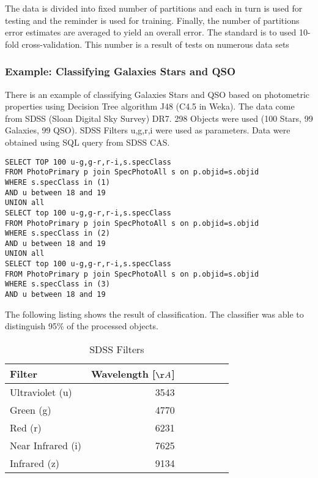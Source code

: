 The data is divided into fixed number of partitions and each in turn
is used for testing and the reminder is used for training. Finally,
the number of partitions error estimates are averaged to yield an
overall error. The standard is to used 10-fold cross-validation. This
number is a result of tests on numerous data sets \citep{witten2005data}

\subsubsection{Example: Classifying Galaxies Stars and QSO}
There is an example of classifying Galaxies Stars and QSO based on
photometric properties using Decision Tree algorithm J48 (C4.5 in
Weka). The data come from SDSS (Sloan Digital Sky Survey) DR7. 298
Objects were used (100 Stars, 99 Galaxies, 99 QSO). SDSS Filters
u,g,r,i were used as parameters. Data were obtained using SQL query
from SDSS CAS.

\begin{lstlisting}
SELECT TOP 100 u-g,g-r,r-i,s.specClass
FROM PhotoPrimary p join SpecPhotoAll s on p.objid=s.objid 
WHERE s.specClass in (1)
AND u between 18 and 19
UNION all
SELECT top 100 u-g,g-r,r-i,s.specClass
FROM PhotoPrimary p join SpecPhotoAll s on p.objid=s.objid 
WHERE s.specClass in (2)
AND u between 18 and 19
UNION all
SELECT top 100 u-g,g-r,r-i,s.specClass
FROM PhotoPrimary p join SpecPhotoAll s on p.objid=s.objid 
WHERE s.specClass in (3)
AND u between 18 and 19
\end{lstlisting}

The following listing shows the result of classification. The
classifier was able to distinguish 95\% of the processed objects.

\begin{table}[ht]
  \centering
  \small
     \begin{tabular}[ht]{l r@{,}l r@{,}l l l}
     \toprule
     Filter & Wavelength [$\AA$] \\
     \midrule
     Ultraviolet (u) & 3543 \\
     Green (g) & 4770\\
     Red (r) & 6231\\
     Near Infrared (i) & 7625\\
     Infrared (z) & 9134 \\
     \bottomrule
   \end{tabular}
  \caption{SDSS Filters}
  \label{tab:SDSSFilter}
\end{table}


